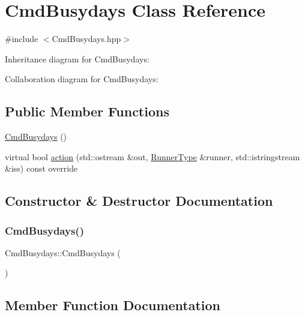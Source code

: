 \hypertarget{classCmdBusydays}{}\section{Cmd\+Busydays Class Reference}
\label{classCmdBusydays}


{\ttfamily \#include $<$Cmd\+Busydays.\+hpp$>$}



Inheritance diagram for Cmd\+Busydays\+:


Collaboration diagram for Cmd\+Busydays\+:
\subsection*{Public Member Functions}
\begin{DoxyCompactItemize}
\item 
\hyperlink{classCmdBusydays_a9afc7fd1152795834b6fd085ae5f0e78}{Cmd\+Busydays} ()
\item 
virtual bool \hyperlink{classCmdBusydays_af53f2b27156a0e94911dd5e6ae4149f8}{action} (std\+::ostream \&out, \hyperlink{Command_8hpp_ad45c3de597c2023a8be0399d914161f4}{Runner\+Type} \&runner, std\+::istringstream \&iss) const override
\end{DoxyCompactItemize}


\subsection{Constructor \& Destructor Documentation}
\mbox{\label{classCmdBusydays_a9afc7fd1152795834b6fd085ae5f0e78}} 
\subsubsection{\texorpdfstring{Cmd\+Busydays()}{CmdBusydays()}}
{\footnotesize\ttfamily Cmd\+Busydays\+::\+Cmd\+Busydays (\begin{DoxyParamCaption}{ }\end{DoxyParamCaption})}



\subsection{Member Function Documentation}
\mbox{\label{classCmdBusydays_af53f2b27156a0e94911dd5e6ae4149f8}} 
